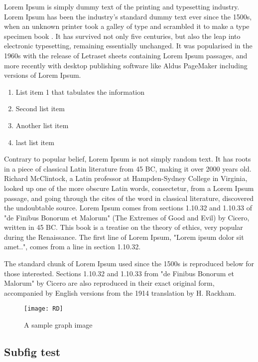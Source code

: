 
Lorem Ipsum is simply dummy text of the printing and typesetting industry. Lorem Ipsum has been the industry's standard dummy text ever since the 1500s, when an unknown printer took a galley of type and scrambled it to make a type specimen book \cite{gridftp}. It has survived not only five centuries, but also the leap into electronic typesetting, remaining essentially unchanged. It was popularised in the 1960s with the release of Letraset sheets containing Lorem Ipsum passages, and more recently with desktop publishing software like Aldus PageMaker including versions of Lorem Ipsum.
\begin{enumerate}
  \item
  List item 1 that tabulates the information
  \item
  Second list item
  \item
  Another list item
  \item
  last list item
\end{enumerate}

Contrary to popular belief, Lorem Ipsum is not simply random text. It has roots in a piece of classical Latin literature from 45 BC, making it over 2000 years old. Richard McClintock, a Latin professor at Hampden-Sydney College in Virginia, looked up one of the more obscure Latin words, consectetur, from a Lorem Ipsum passage, and going through the cites of the word in classical literature, discovered the undoubtable source. Lorem Ipsum comes from sections 1.10.32 and 1.10.33 of "de Finibus Bonorum et Malorum" (The Extremes of Good and Evil) by Cicero, written in 45 BC. This book is a treatise on the theory of ethics, very popular during the Renaissance. The first line of Lorem Ipsum, "Lorem ipsum dolor sit amet..", comes from a line in section 1.10.32.

The standard chunk of Lorem Ipsum used since the 1500s is reproduced below for those interested. Sections 1.10.32 and 1.10.33 from "de Finibus Bonorum et Malorum" by Cicero are also reproduced in their exact original form, accompanied by English versions from the 1914 translation by H. Rackham.

\begin{figure}[ht]
  \begin{center}
    \texttt{[image: RD]}
    \caption{A sample graph image}
  \end{center}
\end{figure}

\subsection{Subfig test}

